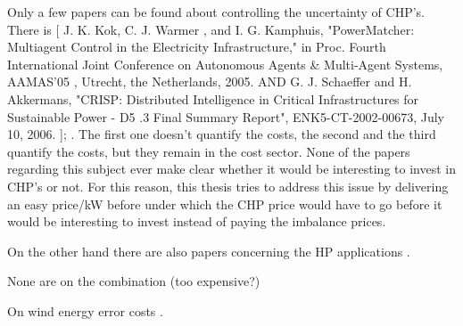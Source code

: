 Only a few papers can be found about controlling the uncertainty of CHP's. There is [ J. K. Kok, C. J. Warmer
, and I. G. Kamphuis, "PowerMatcher:
Multiagent Control in the Electricity Infrastructure," in
Proc. Fourth
International Joint Conference on Autonomous Agents \& Multi-Agent
Systems, AAMAS'05
, Utrecht, the Netherlands, 2005.
AND G. J. Schaeffer and H. Akkermans, "CRISP: Distributed Intelligence in
Critical Infrastructures for
Sustainable Power - D5
.3 Final Summary
Report", ENK5-CT-2002-00673, July 10, 2006. ]; \cite{Houwing2009}. The first one doesn't quantify the costs, the second and the third quantify the costs, but they remain in the cost sector. None of the papers regarding this subject ever make clear whether it would be interesting to invest in CHP's or not. For this reason, this thesis tries to address this issue by delivering an easy price/kW before under which the CHP price would have to go before it would be interesting to invest instead of paying the imbalance prices.

On the other hand there are also papers concerning the HP applications \cite{Meibom2007}.

None are on the combination (too expensive?)

On wind energy error costs \cite{Fabbri2005}.